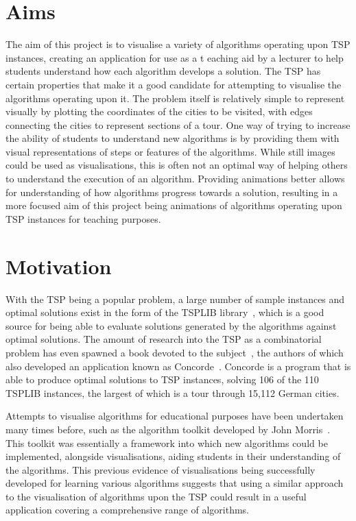 \documentclass{l4proj}
\begin{document}
\section{Aims}
The aim of this project is to visualise a variety of algorithms operating upon TSP instances, creating an application for use as a t
eaching aid by a lecturer to help students understand how each algorithm develops a solution. The TSP has certain properties that make 
it a good candidate for attempting to visualise the algorithms operating upon it. The problem itself is relatively simple to represent 
visually by plotting the coordinates of the cities to be visited, with edges connecting the cities to represent sections of a tour. 
One way of trying to increase the ability of students to understand new algorithms is by providing them with visual representations of 
steps or features of the algorithms. While still images could be used as visualisations, this is often not an optimal way of helping 
others to understand the execution of an algorithm. Providing animations better allows for understanding of how algorithms progress 
towards a solution, resulting in a more focused aim of this project being animations of algorithms operating upon TSP instances for 
teaching purposes.

\section{Motivation}
With the TSP being a popular problem, a large number of sample instances and optimal solutions exist in the form of the 
TSPLIB library~\cite{TSPLIBsite}, which is a good source for being able to evaluate solutions generated by the algorithms against 
optimal solutions. The amount of research into the TSP 
as a combinatorial problem has even spawned a book devoted to the subject~\cite{TSPBook}, the authors of which also developed an application known 
as Concorde~\cite{concordeSite}. Concorde is a program that is able to produce optimal solutions to TSP instances, solving 106 of the 110 TSPLIB 
instances, the largest of which is a tour through 15,112 German cities.

Attempts to visualise algorithms for educational purposes have been undertaken many times before, such as the algorithm toolkit developed by 
John Morris~\cite{algAnim}. This toolkit was essentially a framework into which new algorithms could be implemented, alongside visualisations, 
aiding students in their understanding of the algorithms. This previous evidence of visualisations being successfully developed for learning 
various algorithms suggests that using a similar approach to the visualisation of algorithms upon the TSP could result in a useful application 
covering a comprehensive range of algorithms.
\end{document}
